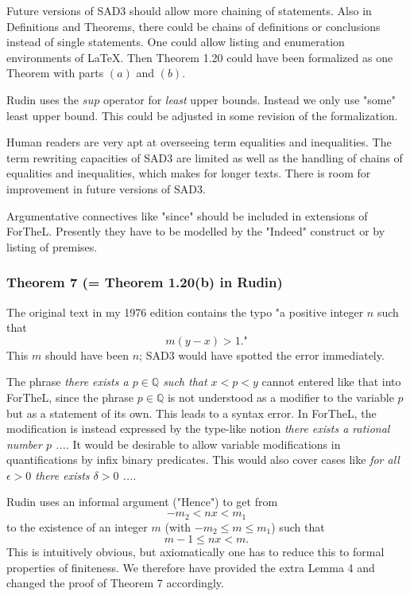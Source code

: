 \documentclass{article}
\newcommand{\QQ}{\mathbb{Q}}
\begin{document}
Future versions of SAD3 should allow more chaining of statements. Also in Definitions and Theorems, there could be chains of definitions or conclusions instead of single statements. One could allow listing and enumeration environments of {\LaTeX}. Then Theorem 1.20 could have been formalized as one Theorem with parts $(a)$ and $(b)$.

Rudin uses the $sup$ operator for {\it least} upper bounds. Instead we only use "some" least upper bound. This could be adjusted in some revision of the formalization.

Human readers are very apt at overseeing term equalities and inequalities. The term rewriting capacities of SAD3 are limited as well as the handling of chains of equalities and inequalities, which makes for longer texts. There is room for improvement in future versions of SAD3.

Argumentative connectives like "since" should be included in extensions of ForTheL. Presently they have to be modelled by the "Indeed" construct or by listing of premises.

\subsubsection{Theorem 7 (= Theorem 1.20(b) in Rudin)}

The original text in my 1976 edition contains the typo "a positive integer $n$ such that
$$m (y-x) > 1.\text{"}$$
This $m$ should have been $n$; SAD3 would have spotted the error immediately.


The phrase {\it there exists a $p \in \QQ$ such that $x < p < y$} cannot entered like that into ForTheL, since the phrase $p \in \QQ$ is not understood as a modifier to the variable $p$ but as a statement of its own. This leads to a syntax error. In ForTheL, the modification is instead expressed by the type-like notion {\it there exists a rational number $p$ ...}. It would be desirable to allow variable modifications in quantifications by infix binary predicates. This would also cover cases like {\it for all $\epsilon > 0$ there exists $\delta > 0$ ...}.

Rudin uses an informal argument ("Hence") to get from
$$-m_2 <n x < m_1$$
to the existence of an integer $m$ (with $-m_2 \leq m \leq m_1$) such that
$$m-1 \leq n x < m.$$
This is intuitively obvious, but axiomatically one has to reduce this to formal properties of finiteness. We therefore have provided the extra Lemma 4 and changed the proof of Theorem 7 accordingly.
\end{document}

